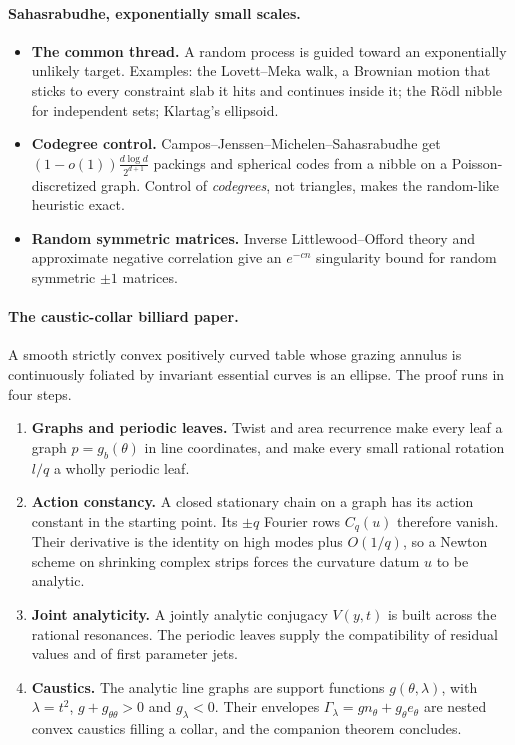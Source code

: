 \paragraph{Sahasrabudhe, exponentially small scales.}
\begin{itemize}[leftmargin=*]
\item \textbf{The common thread.} A random process is guided toward an exponentially unlikely target. Examples: the Lovett--Meka
walk, a Brownian motion that sticks to every constraint slab it hits and continues inside it; the R\"odl nibble for independent sets;
Klartag's ellipsoid.
\item \textbf{Codegree control.} Campos--Jenssen--Michelen--Sahasrabudhe get $(1-o(1))\frac{d\log d}{2^{d+1}}$ packings and spherical codes
from a nibble on a Poisson-discretized graph. Control of \emph{codegrees}, not triangles, makes the random-like heuristic exact.
\item \textbf{Random symmetric matrices.} Inverse Littlewood--Offord theory and approximate negative correlation give an
$e^{-cn}$ singularity bound for random symmetric $\pm1$ matrices.
\end{itemize}

\paragraph{The caustic-collar billiard paper.} A smooth strictly convex positively curved table whose grazing annulus is
continuously foliated by invariant essential curves is an ellipse. The proof runs in four steps.
\begin{enumerate}[leftmargin=*]
\item \textbf{Graphs and periodic leaves.} Twist and area recurrence make every leaf a graph $p=g_b(\theta)$ in line coordinates, and
make every small rational rotation $l/q$ a wholly periodic leaf.
\item \textbf{Action constancy.} A closed stationary chain on a graph has its action constant in the starting point. Its $\pm q$
Fourier rows $C_q(u)$ therefore vanish. Their derivative is the identity on high modes plus $O(1/q)$, so a Newton scheme on shrinking
complex strips forces the curvature datum $u$ to be analytic.
\item \textbf{Joint analyticity.} A jointly analytic conjugacy $V(y,t)$ is built across the rational resonances. The periodic leaves
supply the compatibility of residual values and of first parameter jets.
\item \textbf{Caustics.} The analytic line graphs are support functions $g(\theta,\lambda)$, with $\lambda=t^2$, $g+g_{\theta\theta}>0$ and
$g_\lambda<0$. Their envelopes $\Gamma_\lambda=gn_\theta+g_\theta e_\theta$ are nested convex caustics filling a collar, and the companion theorem
concludes.
\end{enumerate}
